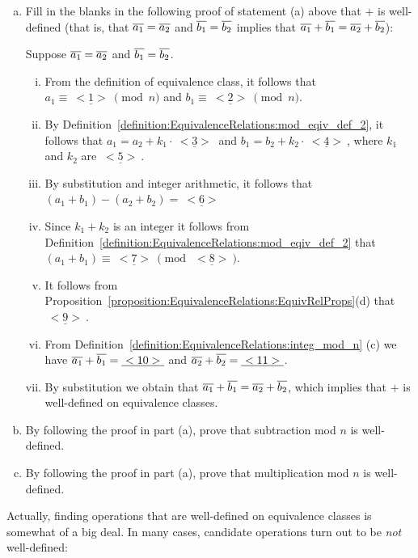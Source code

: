 \begin{exercise}{54} 
\begin{enumerate}[(a)]
\item 
Fill in the blanks in the following proof of statement (a) above that $\mathbin{+}$ is well-defined (that is, that  $\overline{a_1} = \overline{a_2}$ and $\overline{b_1} = \overline{b_2}$ implies that $\overline{a_1} + \overline{b_1} = \overline{a_2} + \overline{b_2}$):

Suppose $\overline{a_1} = \overline{a_2}$ and $\overline{b_1} = \overline{b_2}$. 
\begin{enumerate}[(i)]
\item
From the definition of equivalence class, it follows that  $a_1 \equiv \underline{~<1>~} \pmod{n}$ and $b_1 \equiv \underline{~<2>~} \pmod{n}$. 
\item  
By Definition~\ref{definition:EquivalenceRelations:mod_eqiv_def_2}, it follows that 
$a_1  = a_2 + k_1 \cdot \underline{~<3>~}$ and $b_1  = b_2 + k_2 \cdot \underline{~<4>~}$, where $k_1$ and $k_2$ are $\underline{~<5>~}$. 
\item
By substitution and integer arithmetic,  it follows that $(a_1 + b_1) - (a_2 + b_2) =  \underline{~<6>~}$
\item
Since $k_1 + k_2$ is an integer it follows from Definition~\ref{definition:EquivalenceRelations:mod_eqiv_def_2} that $(a_1 + b_1) \equiv \underline{~<7>~} \pmod{\underline{~<8>~}}$.
\item 
It follows from Proposition~\ref{proposition:EquivalenceRelations:EquivRelProps}(d) that $\underline{~<9>~}$.
\item
From Definition~\ref{definition:EquivalenceRelations:integ_mod_n} (c) we have $\overline{a_1} \mathbin{+} \overline{b_1} =  \underline{~<10>~}$ and $\overline{a_2} \mathbin{+} \overline{b_2} =  \underline{~<11>~}$.
\item
By substitution we obtain that $\overline{a_1} + \overline{b_1} = \overline{a_2} + \overline{b_2}$, which implies that  $\mathbin{+}$ is well-defined on equivalence classes.
\end{enumerate}
\item By following the proof in part (a), prove that subtraction mod $n$ is well-defined.
\item By following the proof in part (a), prove that multiplication mod $n$ is well-defined.
\end{enumerate}
\end{exercise}

Actually, finding operations that are well-defined on equivalence classes is somewhat of a big deal. In many cases, candidate operations turn out to be \emph{not} well-defined:

